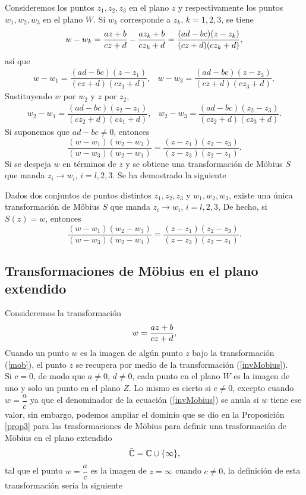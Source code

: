 Consideremos los puntos $z_{1}, z_{2}, z_{3}$ en el plano $z$ y respectivamente los puntos $w_{1}, w_{2}, w_{3}$ en el plano $W$. Si $w_k$ corresponde a $z_k$, $k=1,2,3$, se tiene 
$$w-w_k=\dfrac{az+b}{cz+d}-\dfrac{az_k+b}{cz_k+d}=\dfrac{(ad-bc)(z-z_k)}{(cz+d)(cz_k+d)},$$
así que 
\[
	\begin{array}{cc}
		w-w_1=\dfrac{(ad-bc)(z-z_1)}{(cz+d)(cz_1+d)},&w-w_3=\dfrac{(ad-bc)(z-z_3)}{(cz+d)(cz_3+d)},
	\end{array}
\]
Sustituyendo $w$ por $w_2$ y $z$ por $z_2$,
\[
\begin{array}{cc}
	w_2-w_1=\dfrac{(ad-bc)(z_2-z_1)}{(cz_2+d)(cz_1+d)},&w_2-w_3=\dfrac{(ad-bc)(z_2-z_3)}{(cz_2+d)(cz_3+d)}.
\end{array}
\]
Si suponemos que $ad-bc\neq 0$, entonces 
\begin{equation}\label{razoncruzada}
	\dfrac{(w-w_1)(w_2-w_3)}{(w-w_3)(w_2-w_1)}=\dfrac{(z-z_1)(z_2-z_3)}{(z-z_3)(z_2-z_1)}.
\end{equation}
Si se despeja $w$ en términos de $z$ y se obtiene una transformación de M\"obius $S$ que manda $z_i \rightarrow w_i$, $i = l , 2, 3$. Se ha demostrado la siguiente
\begin{prop}
	Dados dos conjuntos de puntos distintos $z_{1}, z_{2}, z_{3}$ y $w_{1}, w_{2}, w_{3}$, existe una única transformación de M\"obius $S$ que manda $z_i \rightarrow w_i$, $i = l , 2, 3$, De hecho, si $S(z) = w$, entonces $$\dfrac{(w-w_1)(w_2-w_3)}{(w-w_3)(w_2-w_1)}=\dfrac{(z-z_1)(z_2-z_3)}{(z-z_3)(z_2-z_1)}.$$
\end{prop}
\subsection{Transformaciones de M\"obius en el plano extendido}

Consideremos la transformación 
\begin{equation}\label{mob}
	w=\dfrac{az+b}{cz+d},
\end{equation} 
Cuando un punto $w$ es la imagen de algún punto $z$ bajo la transformación (\ref{mob}), el punto $z$ se recupera por medio de la transformación (\ref{invMobius}).\\
Si $c=0$, de modo que $a\neq 0$, $d\neq 0$, cada punto en el plano $W$ es la imagen de uno y solo un punto en el plano $Z$. Lo mismo es cierto si  $c\neq 0$, excepto cuando $w=\dfrac{a}{c}$ ya que el denominador de la ecuación (\ref{invMobius}) se anula si $w$ tiene ese valor, sin embargo, podemos ampliar el dominio que se dio en la Proposición \ref{prop3} para las trasformaciones de M\"obius para definir una trasformación de M\"obius  en el plano extendido
$$\bar{\mathbb{C}}=\mathbb{C}\cup \{\infty\},$$
tal que el punto $w=\dfrac{a}{c}$ es la imagen de $z=\infty$ cuando $c\neq 0$, la definición de esta transformación sería la siguiente 

